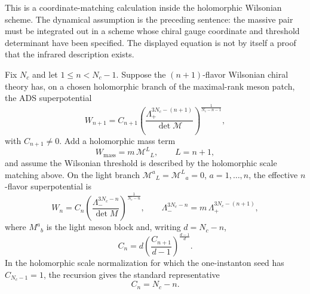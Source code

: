 This is a coordinate-matching calculation inside the holomorphic Wilsonian
scheme.  The dynamical assumption is the preceding sentence: the massive
pair must be integrated out in a scheme whose chiral gauge coordinate and
threshold determinant have been specified.  The displayed equation is not by
itself a proof that the infrared description exists.

\begin{proposition}
\label{prop:ads-holomorphic-decoupling-recursion}
Fix \(N_c\) and let \(1\leq n<N_c-1\).  Suppose the \((n+1)\)-flavor
Wilsonian chiral theory has, on a chosen holomorphic branch of the
maximal-rank meson patch, the ADS superpotential
\[
  W_{n+1}
  =
  C_{n+1}
  \left(
    \frac{\Lambda_{+}^{3N_c-(n+1)}}{\det \mathcal M}
  \right)^{\frac{1}{N_c-n-1}},
\]
with \(C_{n+1}\neq0\).  Add a holomorphic mass term
\[
  W_{\mathrm{mass}}=m\,\mathcal M^L{}_L,\qquad L=n+1,
\]
and assume the Wilsonian threshold is described by
the holomorphic scale matching above.  On the light branch
\(\mathcal M^a{}_L=\mathcal M^L{}_a=0\), \(a=1,\ldots,n\), the effective
\(n\)-flavor superpotential is
\begin{equation}
  W_n
  =
  C_n
  \left(
    \frac{\Lambda_-^{3N_c-n}}{\det M}
  \right)^{\frac{1}{N_c-n}},
  \qquad
  \Lambda_-^{3N_c-n}=m\,\Lambda_+^{3N_c-(n+1)},
  \label{eq:ads-decoupling-recursion-result}
\end{equation}
where \(M^a{}_b\) is the light meson block and, writing \(d=N_c-n\),
\begin{equation}
  C_n
  =
  d\left(\frac{C_{n+1}}{d-1}\right)^{\frac{d-1}{d}} .
  \label{eq:ads-coefficient-recursion}
\end{equation}
In the holomorphic scale normalization for which the one-instanton seed has
\(C_{N_c-1}=1\), the recursion gives the standard representative
\[
  C_n=N_c-n .
\]
\end{proposition}

